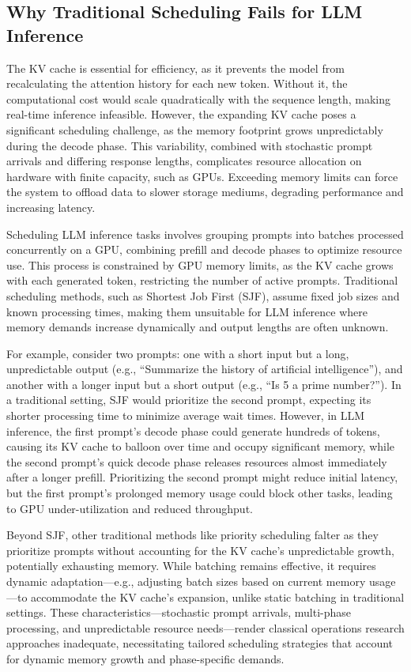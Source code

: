 \documentclass[preprint]{article}
\theoremstyle{plain}
\theoremstyle{definition}
\theoremstyle{remark}
\begin{document}
\subsection{Why Traditional Scheduling Fails for LLM Inference}

The KV cache is essential for efficiency, as it prevents the model from recalculating the attention history for each new token. Without it, the computational cost would scale quadratically with the sequence length, making real-time inference infeasible. However, the expanding KV cache poses a significant scheduling challenge, as the memory footprint grows unpredictably during the decode phase. This variability, combined with stochastic prompt arrivals and differing response lengths, complicates resource allocation on hardware with finite capacity, such as GPUs. Exceeding memory limits can force the system to offload data to slower storage mediums, degrading performance and increasing latency.

Scheduling LLM inference tasks involves grouping prompts into batches processed concurrently on a GPU, combining prefill and decode phases to optimize resource use. This process is constrained by GPU memory limits, as the KV cache grows with each generated token, restricting the number of active prompts. Traditional scheduling methods, such as Shortest Job First (SJF), assume fixed job sizes and known processing times, making them unsuitable for LLM inference where memory demands increase dynamically and output lengths are often unknown. 

For example, consider two prompts: one with a short input but a long, unpredictable output (e.g., ``Summarize the history of artificial intelligence''), and another with a longer input but a short output (e.g., ``Is 5 a prime number?''). In a traditional setting, SJF would prioritize the second prompt, expecting its shorter processing time to minimize average wait times. However, in LLM inference, the first prompt's decode phase could generate hundreds of tokens, causing its KV cache to balloon over time and occupy significant memory, while the second prompt's quick decode phase releases resources almost immediately after a longer prefill. Prioritizing the second prompt might reduce initial latency, but the first prompt's prolonged memory usage could block other tasks, leading to GPU under-utilization and reduced throughput. 

Beyond SJF, other traditional methods like priority scheduling falter as they prioritize prompts without accounting for the KV cache's unpredictable growth, potentially exhausting memory. While batching remains effective, it requires dynamic adaptation—e.g., adjusting batch sizes based on current memory usage—to accommodate the KV cache's expansion, unlike static batching in traditional settings. These characteristics—stochastic prompt arrivals, multi-phase processing, and unpredictable resource needs—render classical operations research approaches inadequate, necessitating tailored scheduling strategies that account for dynamic memory growth and phase-specific demands.
\end{document}
